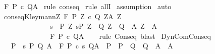 \begin{isabellebody}
{\isasymLongrightarrow}\ {\isasymGamma}{\isacharcomma}{\isasymTheta}{\isasymturnstile}\isactrlbsub {\isacharslash}F\ \isactrlesub P\ c\ Q{\isacharcomma}A{\isachardoublequoteclose}\isanewline
%
\isadelimproof
%
\endisadelimproof
%
\isatagproof
{}\isamarkupfalse%
\ {\isacharparenleft}rule\ conseq{\isacharparenright}\isanewline
{}\isamarkupfalse%
\ {\isacharparenleft}rule\ allI{\isacharparenright}\isanewline
{}\isamarkupfalse%
\ assumption\isanewline
{}\isamarkupfalse%
\ auto\isanewline
{}\isamarkupfalse%
%
\endisatagproof
{\isafoldproof}%
%
\isadelimproof
\isanewline
%
\endisadelimproof
\isanewline
{}\isamarkupfalse%
\ conseq{\isacharunderscore}Kleymann{\isacharcolon}{\isachardoublequoteopen}{\isasymlbrakk}{\isasymforall}Z{\isachardot}\ {\isasymGamma}{\isacharcomma}{\isasymTheta}{\isasymturnstile}\isactrlbsub {\isacharslash}F\isactrlesub \ {\isacharparenleft}P{\isacharprime}\ Z{\isacharparenright}\ c\ {\isacharparenleft}Q{\isacharprime}\ Z{\isacharparenright}{\isacharcomma}{\isacharparenleft}A{\isacharprime}\ Z{\isacharparenright}{\isacharsemicolon}\isanewline
\ \ \ \ \ \ \ \ \ \ \ \ \ \ {\isasymforall}s\ {\isasymin}\ P{\isachardot}\ {\isacharparenleft}{\isasymexists}Z{\isachardot}\ s{\isasymin}P{\isacharprime}\ Z\ {\isasymand}\ {\isacharparenleft}Q{\isacharprime}\ Z\ {\isasymsubseteq}\ Q{\isacharparenright}\ {\isasymand}\ {\isacharparenleft}A{\isacharprime}\ Z\ {\isasymsubseteq}\ A{\isacharparenright}{\isacharparenright}{\isasymrbrakk}\isanewline
\ \ \ \ \ \ \ \ \ \ \ \ \ \ {\isasymLongrightarrow}\isanewline
\ \ \ \ \ \ \ \ \ \ \ \ \ \ {\isasymGamma}{\isacharcomma}{\isasymTheta}{\isasymturnstile}\isactrlbsub {\isacharslash}F\isactrlesub \ P\ c\ Q{\isacharcomma}A{\isachardoublequoteclose}\isanewline
%
\isadelimproof
\ \ %
\endisadelimproof
%
\isatagproof
{}\isamarkupfalse%
\ {\isacharparenleft}rule\ Conseq{\isacharprime}{\isacharparenright}\ blast%
\endisatagproof
{\isafoldproof}%
%
\isadelimproof
\isanewline
%
\endisadelimproof
\isanewline
{}\isamarkupfalse%
\ DynComConseq{\isacharcolon}\isanewline
\ \ \ {\isachardoublequoteopen}P\ {\isasymsubseteq}\ {\isacharbraceleft}s{\isachardot}\ {\isasymexists}P{\isacharprime}\ Q{\isacharprime}\ A{\isacharprime}{\isachardot}\ \ {\isasymGamma}{\isacharcomma}{\isasymTheta}{\isasymturnstile}\isactrlbsub {\isacharslash}F\ \isactrlesub P{\isacharprime}\ {\isacharparenleft}c\ s{\isacharparenright}\ Q{\isacharprime}{\isacharcomma}A{\isacharprime}\ {\isasymand}\ P\ {\isasymsubseteq}\ P{\isacharprime}\ {\isasymand}\ Q{\isacharprime}\ {\isasymsubseteq}\ Q\ {\isasymand}\ A{\isacharprime}\ {\isasymsubseteq}\ A{\isacharbraceright}{\isachardoublequoteclose}\ \isanewline

\end{isabellebody}
